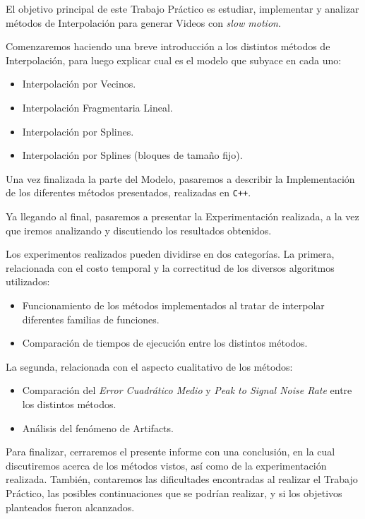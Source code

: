  El objetivo principal de este Trabajo Práctico es estudiar, implementar y analizar
 métodos de Interpolación para generar Videos con \textit{slow motion}.

Comenzaremos haciendo una breve introducción a los distintos métodos de Interpolación,
para luego explicar cual es el modelo que subyace en cada uno:
\begin{itemize}
    \item Interpolación por Vecinos.
    \item Interpolación Fragmentaria Lineal.
    \item Interpolación por Splines.
    \item Interpolación por Splines (bloques de tamaño fijo).
\end{itemize}

Una vez finalizada la parte del Modelo, pasaremos a describir la Implementación de los
diferentes métodos presentados, realizadas en \texttt{C++}.

Ya llegando al final, pasaremos a presentar la Experimentación realizada, a la vez
que iremos analizando y discutiendo los resultados obtenidos.

Los experimentos realizados pueden dividirse en dos categorías. La primera, relacionada
con el costo temporal y la correctitud de los diversos algoritmos utilizados:
\begin{itemize}
    \item Funcionamiento de los métodos implementados al tratar de interpolar diferentes
        familias de funciones.
    \item Comparación de tiempos de ejecución entre los distintos métodos.
\end{itemize}

La segunda, relacionada con el aspecto cualitativo de los métodos:
\begin{itemize}
    \item Comparación del \textit{Error Cuadrático Medio} y \textit{Peak to Signal Noise Rate} entre
        los distintos métodos.
    \item Análisis del fenómeno de Artifacts.
\end{itemize}

Para finalizar, cerraremos el presente informe con una conclusión, en la cual
discutiremos acerca de los métodos vistos, así como de la experimentación realizada.
También, contaremos las dificultades encontradas al realizar el Trabajo Práctico,
las posibles continuaciones que se podrían realizar, y si los objetivos planteados
fueron alcanzados.
